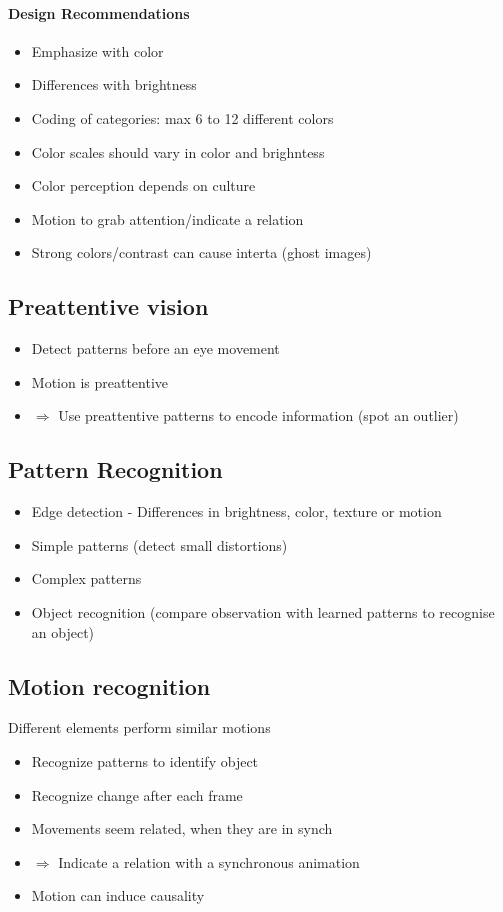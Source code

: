 \documentclass[10pt,a4paper]{article}
\begin{document}
	\paragraph*{Design Recommendations}
	\begin{itemize}
		\item Emphasize with color
		\item Differences with brightness
		\item Coding of categories: max 6 to 12 different colors
		\item Color scales should vary in color and brighntess 
		\item Color perception depends on culture
		\item Motion to grab attention/indicate a relation
		\item Strong colors/contrast can cause interta (ghost images)
	\end{itemize}
	
	
	\subsection{Preattentive vision}
	\begin{itemize}
		\item Detect patterns before an eye movement
		\item Motion is preattentive
		\item $ \Rightarrow $ Use preattentive patterns to encode information (spot an outlier)
	\end{itemize}
	
	\subsection{Pattern Recognition}
	\begin{itemize}
		\item Edge detection - Differences in brightness, color, texture or motion
		\item Simple patterns (detect small distortions)
		\item Complex patterns
		\item Object recognition (compare observation with learned patterns to recognise an object)
	\end{itemize}
	
	\subsection{Motion recognition}
	Different elements perform similar motions
	\begin{itemize}
		\item Recognize patterns to identify object
		\item Recognize change after each frame
		\item Movements seem related, when they are in synch
		\item $ \Rightarrow $ Indicate a relation with a synchronous animation 
		\item Motion can induce causality
	\end{itemize}
\end{document}
